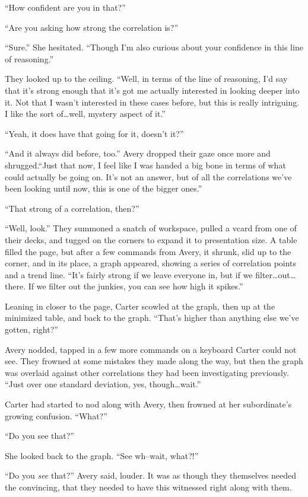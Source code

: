 ``How confident are you in that?''

``Are you asking how strong the correlation is?''

``Sure.'' She hesitated. ``Though I'm also curious about your confidence in this line of reasoning.''

They looked up to the ceiling. ``Well, in terms of the line of reasoning, I'd say that it's strong enough that it's got me actually interested in looking deeper into it. Not that I wasn't interested in these cases before, but this is really intriguing. I like the sort of\ldots{}well, mystery aspect of it.''

``Yeah, it does have that going for it, doesn't it?''

``And it always did before, too.'' Avery dropped their gaze once more and shrugged.``Just that now, I feel like I was handed a big bone in terms of what could actually be going on. It's not an answer, but of all the correlations we've been looking until now, this is one of the bigger ones.''

``That strong of a correlation, then?''

``Well, look.'' They summoned a snatch of workspace, pulled a vcard from one of their decks, and tugged on the corners to expand it to presentation size. A table filled the page, but after a few commands from Avery, it shrunk, slid up to the corner, and in its place, a graph appeared, showing a series of correlation points and a trend line. ``It's fairly strong if we leave everyone in, but if we filter\ldots{}out\ldots{}there. If we filter out the junkies, you can see how high it spikes.''

Leaning in closer to the page, Carter scowled at the graph, then up at the minimized table, and back to the graph. ``That's higher than anything else we've gotten, right?''

Avery nodded, tapped in a few more commands on a keyboard Carter could not see. They frowned at some mistakes they made along the way, but then the graph was overlaid against other correlations they had been investigating previously. ``Just over one standard deviation, yes, though\ldots{}wait.''

Carter had started to nod along with Avery, then frowned at her subordinate's growing confusion. ``What?''

``Do you see that?''

She looked back to the graph. ``See wh--wait, what?!''

``Do you \emph{see} that?'' Avery said, louder. It was as though they themselves needed the convincing, that they needed to have this witnessed right along with them.

